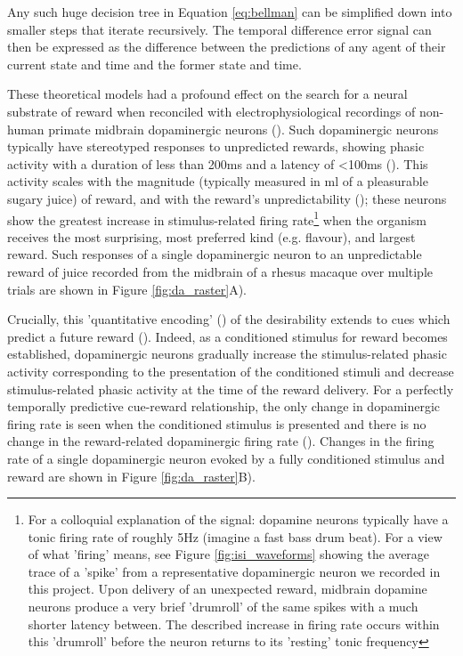 Any such huge decision tree in Equation \ref{eq:bellman} can be simplified down into smaller steps that iterate recursively. The temporal difference error signal can then be expressed as the difference between the predictions of any agent of their current state and time and the former state and time.

These theoretical models had a profound effect on the search for a neural substrate of reward when reconciled with electrophysiological recordings of non-human primate midbrain dopaminergic neurons (\cite{schultzNeuralSubstratePrediction1997}). Such dopaminergic neurons typically have stereotyped responses to unpredicted rewards, showing phasic activity with a duration of less than 200ms and a latency of <100ms (\cite{ljungbergResponsesMonkeyDopamine1992}). This activity scales with the magnitude (typically measured in ml of a pleasurable sugary juice) of reward, and with the reward's unpredictability (\cite{bayerMidbrainDopamineNeurons2005}); these neurons show the greatest increase in stimulus-related firing rate\footnote{  For a colloquial explanation of the signal: dopamine neurons typically have a tonic firing rate of roughly 5Hz (imagine a fast bass drum beat). For a view of what 'firing' means, see Figure \ref{fig:isi_waveforms} showing the average trace of a 'spike' from a representative dopaminergic neuron we recorded in this project. Upon delivery of an unexpected reward, midbrain dopamine neurons produce a very brief 'drumroll' of the same spikes with a much shorter latency between. The described increase in firing rate occurs within this 'drumroll' before the neuron returns to its 'resting' tonic frequency} when the organism receives the most surprising, most preferred kind (e.g. flavour), and largest reward. Such responses of a single dopaminergic neuron to an unpredictable reward of juice recorded from the midbrain of a rhesus macaque over multiple trials are shown in Figure \ref{fig:da_raster}A).

Crucially, this 'quantitative encoding' (\cite{bayerMidbrainDopamineNeurons2005}) of the desirability extends to cues which predict a future reward (\cite{mirenowiczImportanceUnpredictabilityReward1994}). Indeed, as a conditioned stimulus for reward becomes established, dopaminergic neurons gradually increase the stimulus-related phasic activity corresponding to the presentation of the conditioned stimuli and decrease stimulus-related phasic activity at the time of the reward delivery. For a perfectly temporally predictive cue-reward relationship, the only change in dopaminergic firing rate is seen when the conditioned stimulus is presented and there is no change in the reward-related dopaminergic firing rate (\cite{schultzNeuralSubstratePrediction1997}). Changes in the firing rate of a single dopaminergic neuron evoked by a fully conditioned stimulus and reward are shown in Figure \ref{fig:da_raster}B).

